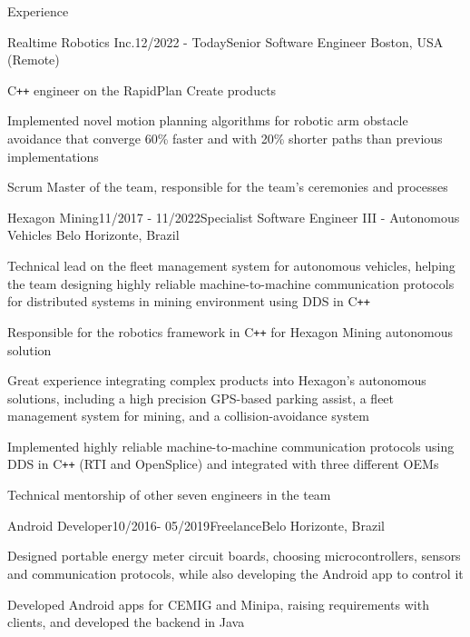 \documentclass[12pt, a4paper]{resume} %
\begin{document}
\begin{rSection}{Experience}

	\begin{rSubsection}{Realtime Robotics Inc.}{12/2022 - Today}{\normalfont Senior Software Engineer}{ \normalfont Boston, USA (Remote)}
		\item C\texttt{++} engineer on the RapidPlan Create products
		\item Implemented novel motion planning algorithms for robotic arm obstacle avoidance that converge 60\% faster and with 20\% shorter paths than previous implementations
		\item Scrum Master of the team, responsible for the team's ceremonies and processes
	\end{rSubsection}

	\begin{rSubsection}{Hexagon Mining}{11/2017 - 11/2022}{\normalfont Specialist Software Engineer III - Autonomous Vehicles}{ \normalfont Belo Horizonte, Brazil}
		\item Technical lead on the fleet management system for autonomous vehicles, helping the team designing highly reliable machine-to-machine communication protocols for distributed systems in mining environment using DDS in C\texttt{++}
		\item Responsible for the robotics framework in C\texttt{++} for Hexagon Mining autonomous solution
		\item Great experience integrating complex products into Hexagon's autonomous solutions, including a high precision GPS-based parking assist, a fleet management system for mining, and a collision-avoidance system
		\item Implemented highly reliable machine-to-machine communication protocols using DDS in C\texttt{++} (RTI and OpenSplice) and integrated with three different OEMs
		\item Technical mentorship of other seven engineers in the team

	\end{rSubsection}

	\begin{rSubsection}{Android Developer}{10/2016- 05/2019}{\normalfont Freelance}{\normalfont Belo Horizonte, Brazil}
		\item Designed portable energy meter circuit boards, choosing microcontrollers, sensors and communication protocols, while also developing the Android app to control it
		\item Developed Android apps for CEMIG and Minipa, raising requirements with clients, and developed the backend in Java
	\end{rSubsection}


\end{rSection}
\end{document}

